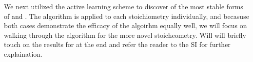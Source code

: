 %



%
We next utilized the active learning scheme to discover of the most stable forms of \IrOtwo and \IrOthree.
%
The algorithm is applied to each stoichiometry individually, and becasuse both cases demonstrate the efficacy of the algoirhm equally well, we will focus on walking through the algorithm for the more novel \IrOthree stoicheometry.
%
Will will briefly touch on the results for \IrOtwo at the end and refer the reader to the SI for further explaination.


